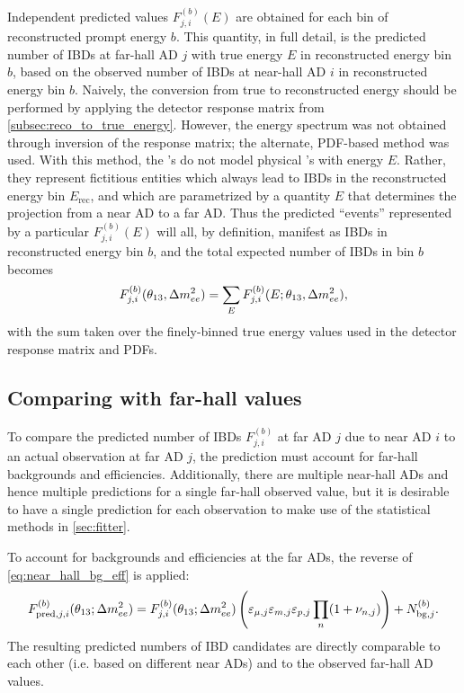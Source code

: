 Independent predicted values $F_{j,i}^{(b)}(E)$ are obtained
for each bin of reconstructed prompt energy $b$.
This quantity, in full detail,
is the predicted number of IBDs at far-hall AD $j$
with true \nuebar{} energy $E$ in reconstructed energy bin $b$,
based on the observed number of IBDs at near-hall AD $i$
in reconstructed energy bin $b$.
Naively, the conversion from true to reconstructed energy
should be performed by applying the detector response matrix
from \cref{subsec:reco_to_true_energy}.
However, the \nuebar{} energy spectrum was not obtained
through inversion of the response matrix;
the alternate, PDF-based method was used.
With this method, the \nuebar{}'s do not model physical \nuebar{}'s with energy $E$.
Rather, they represent fictitious entities which always
lead to IBDs in the reconstructed energy bin $E_\text{rec}$,
and which are parametrized by a quantity $E$ that determines
the projection from a near AD to a far AD.
Thus the predicted ``events'' represented by a particular
$F_{j,i}^{(b)}(E)$ will all, by definition,
manifest as IBDs in reconstructed energy bin $b$,
and the total expected number of IBDs in bin $b$ becomes
\begin{equation}
    F_{j,i}^{(b)}(\theta_{13},\Delta m^2_{ee}) = \sum_E F_{j,i}^{(b)}(E;\theta_{13},\Delta m^2_{ee}),
\end{equation}
with the sum taken over the finely-binned true energy values
used in the detector response matrix and PDFs.

\subsection{Comparing with far-hall values}
\label{subsec:far_bg_eff}

To compare the predicted number of IBDs $F_{j,i}^{(b)}$
at far AD $j$ due to near AD $i$
to an actual observation at far AD $j$,
the prediction must account for far-hall backgrounds and efficiencies.
Additionally, there are multiple near-hall ADs
and hence multiple predictions for a single far-hall observed value,
but it is desirable to have a single prediction for each observation
to make use of the statistical methods in \cref{sec:fitter}.

To account for backgrounds and efficiencies at the far ADs,
the reverse of \cref{eq:near_hall_bg_eff} is applied:
\begin{equation}\label{eq:far_hall_bg_eff}
    F_{\text{pred},j,i}^{(b)}(\theta_{13};\Delta m^2_{ee}) = F_{j,i}^{(b)}(\theta_{13};\Delta m^2_{ee})
    \left(
        \varepsilon_{\mu,j}\varepsilon_{m,j}\varepsilon_{p,j}
        \prod_n(1 + \nu_{n,j})
    \right)
    + N_{\text{bg},j}^{(b)}.
\end{equation}
The resulting predicted numbers of IBD candidates
are directly comparable to each other (i.e. based on different near ADs)
and to the observed far-hall AD values.

